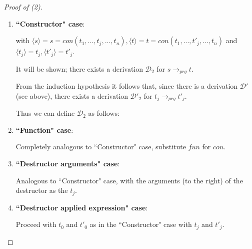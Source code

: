 \documentclass[11pt]{article} %
\begin{document}
\begin{proof}[Proof of (2)]
\begin{enumerate}
\item \textbf{``Constructor" case}:

\begin{prooftree}
\end{prooftree}

with $\langle s \rangle = s = con(t_1, ..., t_j, ..., t_n), \langle t \rangle = t = con(t_1, ..., t'_j, ..., t_n)$ and $\langle t_j \rangle = t_j, \langle t'_j \rangle = t'_j$.

It will be shown; there exists a derivation $\mathcal{D}_2$ for $s \longrightarrow_{prg} t$.

From the induction hypothesis it follows that, since there is a derivation $\mathcal{D'}$ (see above), there exists a derivation $\mathcal{D'}_2$ for $t_j \longrightarrow_{prg} t'_j $.

Thus we can define $\mathcal{D}_2$ as follows:

\begin{prooftree}
\end{prooftree}

\item \textbf{``Function" case}:

Completely analogous to ``Constructor" case, substitute $fun$ for $con$.

\item \textbf{``Destructor arguments" case}:

Analogous to ``Constructor" case, with the arguments (to the right) of the destructor as the $t_j$.

\item \textbf{``Destructor applied expression" case}:

\begin{prooftree}
\end{prooftree}

Proceed with $t_0$ and $t'_0$ as in the ``Constructor" case with $t_j$ and $t'_j$.

\end{enumerate}

\end{proof}
\end{document}
